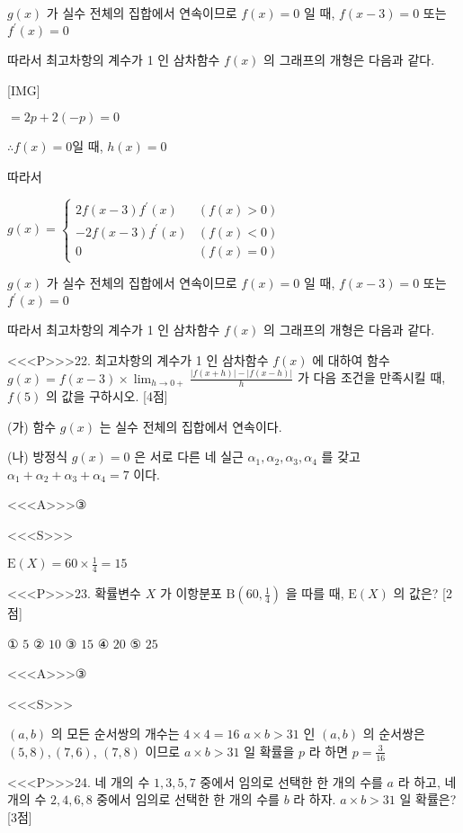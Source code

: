 \documentclass{oblivoir}
\begin{document}
$g(x)$ 가 실수 전체의 집합에서 연속이므로
$f(x)=0$ 일 때, $f(x-3)=0$ 또는 $f^{\prime}(x)=0$

따라서 최고차항의 계수가 1 인 삼차함수 $f(x)$ 의 그래프의 개형은 다음과 같다.

[IMG]

$=2 p+2(-p)=0$

$\therefore f(x)=0$일 때, $h(x)=0$

따라서

$g(x)=\begin{cases}
2 f(x-3) f^{\prime}(x) & (f(x)>0) \\
-2 f(x-3) f^{\prime}(x) & (f(x)<0) \\
0 & (f(x)=0)
\end{cases}
$

$g(x)$ 가 실수 전체의 집합에서 연속이므로
$f(x)=0$ 일 때, $f(x-3)=0$ 또는 $f^{\prime}(x)=0$

따라서 최고차항의 계수가 1 인 삼차함수 $f(x)$ 의 그래프의 개형은 다음과 같다.


<<<P>>>22. 최고차항의 계수가 1 인 삼차함수 $f(x)$ 에 대하여 함수
$g(x)=f(x-3) \times \lim _{h \rightarrow 0+} \frac{|f(x+h)|-|f(x-h)|}{h}$
가 다음 조건을 만족시킬 때, $f(5)$ 의 값을 구하시오. [4점]

(가) 함수 $g(x)$ 는 실수 전체의 집합에서 연속이다.

(나) 방정식 $g(x)=0$ 은 서로 다른 네 실근 $\alpha_{1}, \alpha_{2}, \alpha_{3}, \alpha_{4}$ 를 갖고 $\alpha_{1}+\alpha_{2}+\alpha_{3}+\alpha_{4}=7$ 이다.

<<<A>>>③

<<<S>>>



$ \mathrm{E}(X)=60 \times \frac{1}{4}=15$


<<<P>>>23. 확률변수 $X$ 가 이항분포 $\mathrm{B}\left(60, \frac{1}{4}\right)$ 을 따를 때, $\mathrm{E}(X)$ 의 값은? [2점]

① $5$
② $10$
③ $15$
④ $20$
⑤ $25$

<<<A>>>③

<<<S>>>



$(a, b)$ 의 모든 순서쌍의 개수는 $4 \times 4=16$
$a \times b>31$ 인 $(a, b)$ 의 순서쌍은 $(5,8),(7,6)$,
$(7,8)$ 이므로
$a \times b>31$ 일 확률을 $p$ 라 하면
$p=\frac{3}{16}$


<<<P>>>24. 네 개의 수 $1,3,5,7$ 중에서 임의로 선택한 한 개의 수를 $a$ 라 하고, 네 개의 수 $2,4,6,8$ 중에서 임의로 선택한 한 개의 수를 $b$ 라 하자. $a \times b>31$ 일 확률은? [3점]
\end{document}
